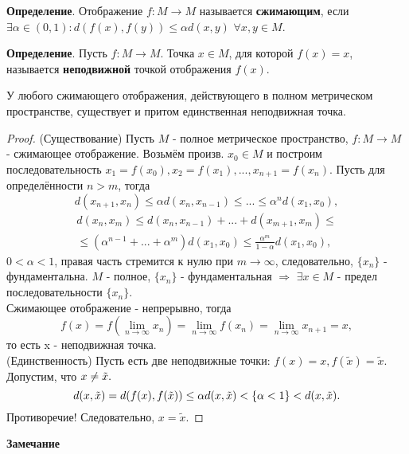 \textbf{Определение}. Отображение $f : M \xrightarrow{} M$ называется
\textbf{сжимающим}, если $\exists \alpha \in (0,1): d(f(x), f(y)) \leq \alpha d(x,y)$ $\forall x,y \in M$.

\textbf{Определение}. Пусть $f : M \rightarrow M$. Точка $x \in M$, для которой $f(x) = x$, называется \textbf{неподвижной} точкой отображения $f(x)$.

\begin{theorem}
    У любого сжимающего отображения, действующего в полном метрическом
пространстве, существует и притом единственная неподвижная точка.
\end{theorem}
\begin{proof}
    (Существование)
Пусть $M$ - полное метрическое пространство, $f : M \rightarrow M$ - сжимающее отображение. Возьмём произв. $x_0 \in M$ и построим последовательность $x_1 = f(x_0), x_2 = f(x_1), ..., x_{n+1} = f(x_n)$. Пусть для определённости $n > m$, тогда
\begin{equation*}
    d(x_{n+1}, x_n) \leq \alpha d(x_n, x_{n-1}) \leq ... \leq \alpha^nd(x_1, x_0),
\end{equation*}
\begin{gather*}
    d(x_n, x_m) \leq d(x_n, x_{n-1}) + ... + d(x_{m+1}, x_m) \leq \\
    \leq (\alpha^{n-1}+...+\alpha^m)d(x_1, x_0) \leq \frac{\alpha^m}{1-\alpha}d(x_1,x_0),
\end{gather*}
$0 < \alpha < 1$, правая часть стремится к нулю при $m \rightarrow \infty$, следовательно, $\{x_n\}$ - фундаментальна.
$M$ - полное, $\{x_n\}$ - фундаментальная $\Rightarrow$ $\exists x \in M$ - предел последовательности  $\{x_n\}$. \\
Сжимающее отображение - непрерывно, тогда
\begin{equation*}
    f(x) = f(\lim\limits_{n \to \infty} x_n) = \lim\limits_{n \to \infty} f(x_n) = \lim\limits_{n \to \infty} x_{n+1} = x,
\end{equation*}
то есть x - неподвижная точка. \\
(Единственность)
Пусть есть две неподвижные точки: $f(x) = x, f(\tilde{x}) = \tilde{x}.$ Допустим, что $x \neq \Tilde{x}.$
\begin{equation*}
    d(x, \Tilde{x}) = d(f(x), f(\Tilde{x})) \leq \alpha d(x, \Tilde{x}) < \{\alpha < 1\} < d(x, \tilde{x}).
\end{equation*}
Противоречие! Следовательно, $x=\tilde{x}$.
\end{proof}
\textbf{Замечание} \\
